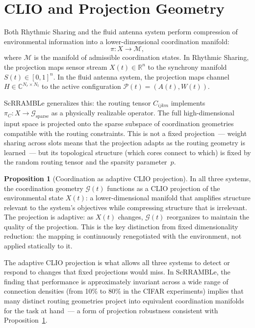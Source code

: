 \documentclass[11pt, a4paper]{article}
\theoremstyle{definition}
\newtheorem{proposition}{Proposition}
\theoremstyle{remark}
\begin{document}
\section{CLIO and Projection Geometry}

Both Rhythmic Sharing and the fluid antenna system perform compression
of environmental information into a lower-dimensional coordination manifold:
\[
\pi: X \to \mathcal{M},
\]
where $\mathcal{M}$ is the manifold of admissible coordination states. In
Rhythmic Sharing, the projection maps sensor stream $X(t) \in \mathbb{R}^n$
to the synchrony manifold $S(t) \in [0,1]^n$. In the fluid antenna system,
the projection maps channel $H \in \mathbb{C}^{N_r \times N_t}$ to the
active configuration $\mathcal{P}(t) = (A(t), W(t))$.

ScRRAMBLe generalizes this: the routing tensor $C_{ijkm}$ implements
$\pi_C: X \to \mathcal{G}_{\mathrm{sparse}}$ as a physically realizable
operator. The full high-dimensional input space is projected onto the sparse
subspace of coordination geometries compatible with the routing constraints.
This is not a fixed projection~--- weight sharing across slots means that
the projection adapts as the routing geometry is learned~--- but its
topological structure (which cores connect to which) is fixed by the random
routing tensor and the sparsity parameter~$p$.

\begin{proposition}[Coordination as adaptive CLIO projection]
\label{prop:clio}
In all three systems, the coordination geometry $\mathcal{G}(t)$ functions
as a CLIO projection of the environmental state $X(t)$: a lower-dimensional
manifold that amplifies structure relevant to the system's objectives while
compressing structure that is irrelevant. The projection is adaptive: as
$X(t)$ changes, $\mathcal{G}(t)$ reorganizes to maintain the quality of
the projection. This is the key distinction from fixed dimensionality
reduction: the mapping is continuously renegotiated with the environment,
not applied statically to it.
\end{proposition}

The adaptive CLIO projection is what allows all three systems to detect or
respond to changes that fixed projections would miss. In ScRRAMBLe, the
finding that performance is approximately invariant across a wide range of
connection densities (from 10\% to 80\% in the CIFAR experiments) implies
that many distinct routing geometries project into equivalent coordination
manifolds for the task at hand~--- a form of projection robustness consistent
with Proposition~\ref{prop:clio}.
\end{document}
